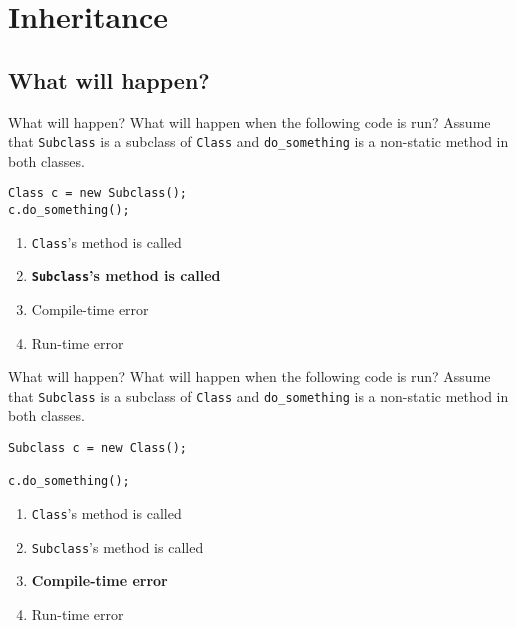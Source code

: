 \documentclass[9pt]{beamer}
\begin{document}
\section{Inheritance}
\subsection{What will happen?}
\begin{frame}[fragile]{What will happen?}
  What will happen when the following code is run? Assume that {\tt Subclass} is
  a subclass of {\tt Class} and {\tt do\_something} is a non-static method in both
  classes. 
  \begin{lstlisting}
Class c = new Subclass();
c.do_something();
  \end{lstlisting}
  \begin{enumerate}
    \item
      {\tt Class}'s method is called
    \item
      \textbf<2>{{\tt Subclass}'s method is called}
    \item
      Compile-time error
    \item
      Run-time error
  \end{enumerate}
\end{frame}

\begin{frame}[fragile]{What will happen?}
  What will happen when the following code is run? Assume that {\tt Subclass} is
  a subclass of {\tt Class} and {\tt do\_something} is a non-static method in both
  classes. 
  \begin{lstlisting}
Subclass c = new Class();

c.do_something();
  \end{lstlisting}
  \begin{enumerate}
    \item
      {\tt Class}'s method is called
    \item
      {\tt Subclass}'s method is called
    \item
      \textbf<2>{Compile-time error}
    \item
      Run-time error
  \end{enumerate}
\end{frame}
\end{document}
